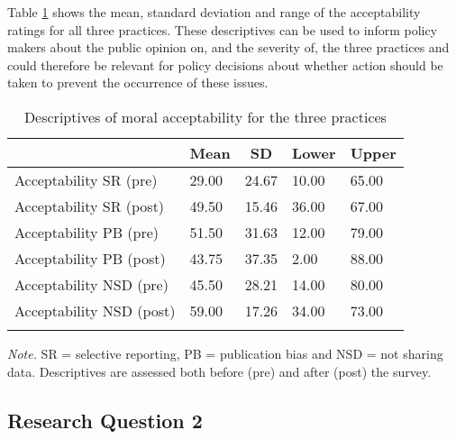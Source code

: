 \documentclass[
  man,floatsintext]{apa7}
\begin{document}
Table \ref{tab:table of descriptives} shows the mean, standard deviation and range of the acceptability ratings for all three practices. These descriptives can be used to inform policy makers about the public opinion on, and the severity of, the three practices and could therefore be relevant for policy decisions about whether action should be taken to prevent the occurrence of these issues.

\begin{table}[h]

\begin{center}
\begin{threeparttable}

\caption{\label{tab:table of descriptives}Descriptives of moral acceptability for the three practices}

\begin{tabular}{lllll}
\toprule
 & \multicolumn{1}{c}{Mean} & \multicolumn{1}{c}{SD} & \multicolumn{1}{c}{Lower} & \multicolumn{1}{c}{Upper}\\
\midrule
Acceptability SR (pre) & 29.00 & 24.67 & 10.00 & 65.00\\
Acceptability SR (post) & 49.50 & 15.46 & 36.00 & 67.00\\
Acceptability PB (pre) & 51.50 & 31.63 & 12.00 & 79.00\\
Acceptability PB (post) & 43.75 & 37.35 & 2.00 & 88.00\\
Acceptability NSD (pre) & 45.50 & 28.21 & 14.00 & 80.00\\
Acceptability NSD (post) & 59.00 & 17.26 & 34.00 & 73.00\\
\bottomrule
\addlinespace
\end{tabular}

\begin{tablenotes}[para]
\normalsize{\textit{Note.} SR = selective reporting, PB = publication bias and NSD = not sharing data. Descriptives are                           assessed both before (pre) and after (post) the survey.}
\end{tablenotes}

\end{threeparttable}
\end{center}

\end{table}

\hypertarget{research-question-2}{%
\subsection{Research Question 2}\label{research-question-2}}
\end{document}

